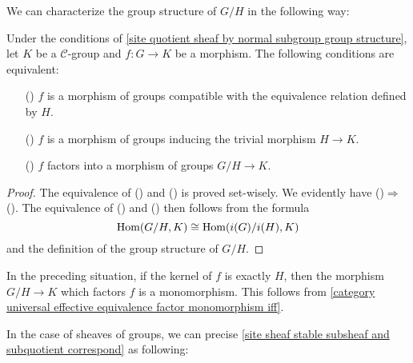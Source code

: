 We can characterize the group structure of $G/H$ in the following way:
\begin{proposition}\label{site quotient by normal subgroup universal prop}
Under the conditions of \cref{site quotient sheaf by normal subgroup group structure}, let $K$ be a $\mathcal{C}$-group and $f:G\to K$ be a morphism. The following conditions are equivalent:
\begin{enumerate}
    \item[(\rmnum{1})] $f$ is a morphism of groups compatible with the equivalence relation defined by $H$.
    \item[(\rmnum{2})] $f$ is a morphism of groups inducing the trivial morphism $H\to K$.
    \item[(\rmnum{3})] $f$ factors into a morphism of groups $G/H\to K$.
\end{enumerate}
\end{proposition}
\begin{proof}
The equivalence of () and () is proved set-wisely. We evidently have ()$\Rightarrow$(). The equivalence of () and () then follows from the formula
\[\mathrm{Hom}(G/H,K)\cong\mathrm{Hom}(i(G)/i(H),K)\]
and the definition of the group structure of $G/H$.
\end{proof}

\begin{remark}\label{site quotient by normal subgroup factorization mono iff kernel}
In the preceding situation, if the kernel of $f$ is exactly $H$, then the morphism $G/H\to K$ which factors $f$ is a monomorphism. This follows from \cref{category universal effective equivalence factor monomorphism iff}.
\end{remark}

In the case of sheaves of groups, we can precise \cref{site sheaf stable subsheaf and subquotient correspond} as following:


